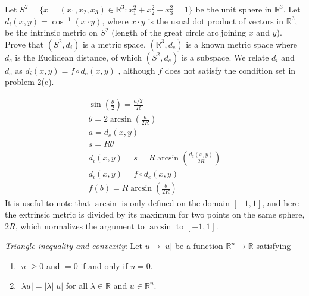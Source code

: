 \documentclass{jhwhw}
\begin{document}
\problem{}%
Let $S^2 = \{x = (x_1,x_2,x_3)\in\mathbb{R}^3 : x_1^2 + x_2^2 + x_3^2  = 1\}$ be the unit sphere  in $\mathbb{R}^3$.  Let $d_i(x,y) = \cos^{-1}(x\cdot y)$, where $x\cdot y$ is the usual dot product of vectors in $\mathbb{R}^3$, be the intrinsic metric on $S^2$ (length of the great circle arc joining $x$ and $y$).    Prove that $(S^2,d_i)$ is a metric space.
\solution
$(\mathbb{R}^3,d_e)$ is a known metric space where $d_e$ is the Euclidean distance, of which $(S^2,d_e)$ is a subspace. We relate $d_i$ and $d_e$ as $d_i (x,y)= f\circ d_e(x,y)$ , although $f$ does not satisfy the condition set in problem 2(c).
\begin{center}
\end{center}
\begin{gather}
\sin\left(\frac{\theta}{2}\right)=\frac{a/2}{R}\\
\theta = 2 \arcsin\left(\frac{a}{2R}\right)\\
a= d_e(x,y)\\
s= R\theta\\
d_i(x,y) = s = R \arcsin\left(\frac{d_e(x,y)}{2R}\right)\\
d_i(x,y) = f\circ d_e(x,y)\\
f(b) = R\arcsin\left(\frac{b}{2R}\right)
\end{gather}
It is useful to note that $\arcsin$ is only defined on the domain $[-1,1]$, and here the extrinsic metric is divided by its maximum for two points on the same sphere, $2R$, which normalizes the argument to $\arcsin$ to $[-1,1]$.

\problem{}%
 \emph{Triangle inequality and convexity}: Let $u\to |u|$ be a function $\mathbb{R}^n \to \mathbb{R}$ satisfying
 \begin{enumerate}
 	\item $|u|\ge 0$ and $=0$ if and only if $u=0$.
 	\item $|\lambda u| =| \lambda||u|$ for all $\lambda\in \mathbb{R}$ and $u\in \mathbb{R}^n$.
 \end{enumerate}
 
\end{document}
